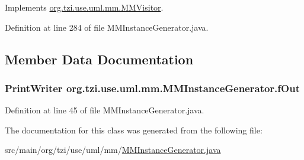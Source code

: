 Implements \hyperlink{interfaceorg_1_1tzi_1_1use_1_1uml_1_1mm_1_1_m_m_visitor_a38bf30d03ab8d2813295504f03d4a33e}{org.\-tzi.\-use.\-uml.\-mm.\-M\-M\-Visitor}.



Definition at line 284 of file M\-M\-Instance\-Generator.\-java.



\subsection{Member Data Documentation}
\hypertarget{classorg_1_1tzi_1_1use_1_1uml_1_1mm_1_1_m_m_instance_generator_a9e560ae4d906000bc78813ea1034bd2c}{
\subsubsection[{f\-Out}]{\setlength{\rightskip}{0pt plus 5cm}Print\-Writer org.\-tzi.\-use.\-uml.\-mm.\-M\-M\-Instance\-Generator.\-f\-Out\hspace{0.3cm}{\ttfamily [protected]}}}\label{classorg_1_1tzi_1_1use_1_1uml_1_1mm_1_1_m_m_instance_generator_a9e560ae4d906000bc78813ea1034bd2c}


Definition at line 45 of file M\-M\-Instance\-Generator.\-java.



The documentation for this class was generated from the following file\-:\begin{DoxyCompactItemize}
\item 
src/main/org/tzi/use/uml/mm/\hyperlink{_m_m_instance_generator_8java}{M\-M\-Instance\-Generator.\-java}\end{DoxyCompactItemize}
